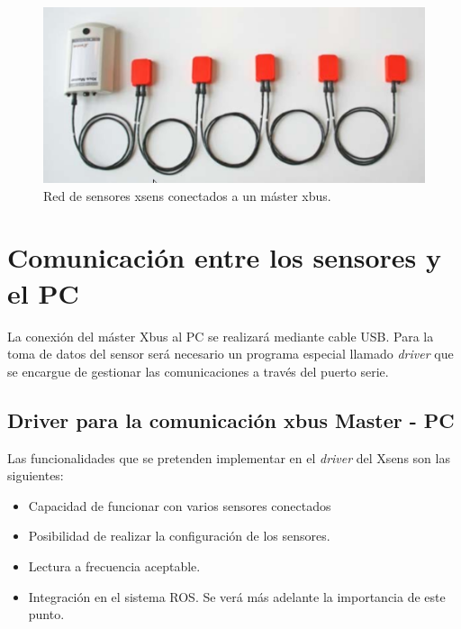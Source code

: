 \documentclass[12pt, a4paper]{report}
\begin{document}
\begin{figure}[h]
	\centering
		\includegraphics[scale=0.4]{../img/xbus_master.png} 
	\caption[Red de sensores xsens conectados a un máster xbus]{Red de sensores xsens conectados a un máster xbus.} 
	\label{fig: xbus_master}
\end{figure}

\section{Comunicación entre los sensores y el PC}

La conexión del máster Xbus al PC se realizará mediante cable USB. Para la toma de datos del sensor será necesario un programa especial llamado \textit{driver} que se encargue de gestionar las comunicaciones a través del puerto serie.

\subsection{Driver para la comunicación xbus Master - PC}

Las funcionalidades que se pretenden implementar en el \textit{driver} del Xsens son las siguientes:

\begin{itemize}

\item Capacidad de funcionar con varios sensores conectados

\item Posibilidad de realizar la configuración de los sensores.

\item Lectura a frecuencia aceptable.

\item Integración en el sistema ROS. Se verá más adelante la importancia de este punto.

\end{itemize}
\end{document}
